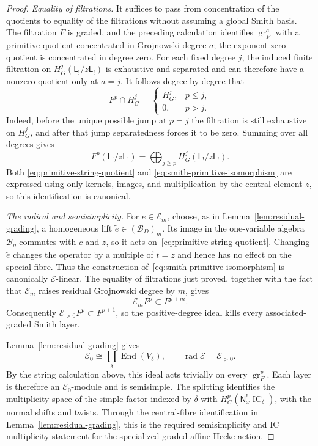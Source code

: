 \documentclass[11pt]{amsart}
\theoremstyle{definition}
\theoremstyle{remark}
\newcommand{\IC}{\operatorname{IC}}
\begin{document}
\begin{proof}
\smallskip
\noindent\emph{Equality of filtrations.}
It suffices to pass from concentration of the quotients to equality of the
filtrations without assuming a global Smith basis.  The filtration $F$ is
graded, and the preceding calculation identifies
$\operatorname{gr}_F^a$ with a primitive quotient concentrated in
Grojnowski degree $a$; the exponent-zero quotient is concentrated in degree
zero.  For each fixed degree $j$, the induced finite filtration on
$H_G^j(\mathsf L_!/z\mathsf L_!)$ is exhaustive and separated and can
therefore have a nonzero quotient only at $a=j$.  It follows degree by
degree that
\[
 F^p\cap H_G^j=
 \begin{cases}
  H_G^j,&p\leq j,\\
  0,&p>j.
 \end{cases}
\]
Indeed, before the unique possible jump at $p=j$ the filtration is still
exhaustive on $H_G^j$, and after that jump separatedness forces it to be
zero.  Summing over all degrees gives
\[
 F^p(\mathsf L_!/z\mathsf L_!)=
 \bigoplus_{j\geq p}H_G^j(\mathsf L_!/z\mathsf L_!).
\]
Both
\eqref{eq:primitive-string-quotient} and
\eqref{eq:smith-primitive-isomorphism} are expressed using only kernels,
images, and multiplication by the central element $z$, so this identification
is canonical.

\smallskip
\noindent\emph{The radical and semisimplicity.}
For $e\in\mathcal E_m$, choose, as in
Lemma~\ref{lem:residual-grading}, a homogeneous lift
$\widetilde e\in(\mathcal B_D)_m$.  Its image in the one-variable algebra
$\mathcal B_\eta$ commutes with $c$ and $z$, so it acts
on~\eqref{eq:primitive-string-quotient}.  Changing $\widetilde e$ changes
the operator by a multiple of $t=z$ and hence has no effect on the special
fibre.  Thus the construction of~\eqref{eq:smith-primitive-isomorphism} is
canonically $\mathcal E$-linear.  The equality of filtrations just proved,
together with the fact that $\mathcal E_m$ raises residual Grojnowski degree
by $m$, gives
\[
 \mathcal E_mF^p\subset F^{p+m}.
\]
Consequently $\mathcal E_{>0}F^p\subset F^{p+1}$, so the positive-degree
ideal kills every associated-graded Smith layer.

Lemma~\ref{lem:residual-grading} gives
\[
 \mathcal E_0\cong\prod_\delta\operatorname{End}(V_\delta),
 \qquad \operatorname{rad}\mathcal E=\mathcal E_{>0}.
\]
By the string calculation above, this ideal acts trivially on every
$\operatorname{gr}^p_F$.  Each layer is therefore an
$\mathcal E_0$-module and is semisimple.  The splitting identifies the
multiplicity space of the simple factor indexed by $\delta$ with
$H_G^p(\mathsf N_x^!\IC_\delta)$, with the normal shifts and twists.
Through the central-fibre identification in
Lemma~\ref{lem:residual-grading}, this is the required
semisimplicity and IC multiplicity statement for the specialized graded
affine Hecke action.
\end{proof}
\end{document}
